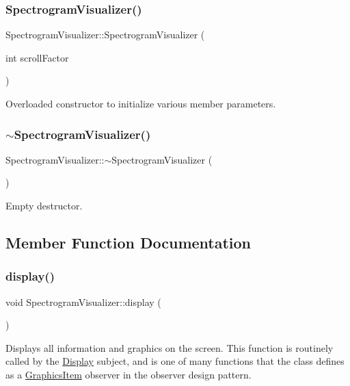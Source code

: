 \subsubsection{\texorpdfstring{Spectrogram\+Visualizer()}{SpectrogramVisualizer()}}
{\ttfamily Spectrogram\+Visualizer\+::\+Spectrogram\+Visualizer (\begin{DoxyParamCaption}\item[{int}]{scroll\+Factor }\end{DoxyParamCaption})}

Overloaded constructor to initialize various member parameters. \hypertarget{structSpectrogramVisualizer_a2b55364382a4ee290918a05946505561}{}\label{structSpectrogramVisualizer_a2b55364382a4ee290918a05946505561} 
\subsubsection{\texorpdfstring{$\sim$\+Spectrogram\+Visualizer()}{~SpectrogramVisualizer()}}
{\ttfamily Spectrogram\+Visualizer\+::$\sim$\+Spectrogram\+Visualizer (\begin{DoxyParamCaption}{ }\end{DoxyParamCaption})}

Empty destructor. 

\subsection{Member Function Documentation}
\hypertarget{structSpectrogramVisualizer_a529c64c733ffc564764593329c483ae2}{}\label{structSpectrogramVisualizer_a529c64c733ffc564764593329c483ae2} 
\subsubsection{\texorpdfstring{display()}{display()}}
{\ttfamily void Spectrogram\+Visualizer\+::display (\begin{DoxyParamCaption}{ }\end{DoxyParamCaption})\hspace{0.3cm}{\ttfamily [virtual]}}

Displays all information and graphics on the screen. This function is routinely called by the \hyperlink{classDisplay}{Display} subject, and is one of many functions that the class defines as a \hyperlink{classGraphicsItem}{Graphics\+Item} observer in the observer design pattern. 

